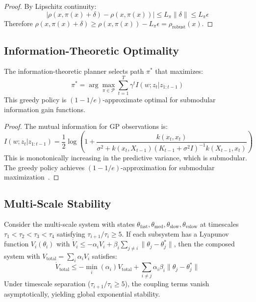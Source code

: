 \begin{proof}
By Lipschitz continuity:
\begin{equation}
    |\rho(x, \pi(x) + \delta) - \rho(x, \pi(x))| \leq L_\pi \|\delta\| \leq L_\pi \epsilon
\end{equation}
Therefore $\rho(x, \pi(x) + \delta) \geq \rho(x, \pi(x)) - L_\pi \epsilon = \rho_{\text{robust}}(x)$.
\end{proof}

\subsection{Information-Theoretic Optimality}

\begin{theorem}
\label{thm:info_optimality}
The information-theoretic planner selects path $\pi^*$ that maximizes:
\begin{equation}
    \pi^* = \arg\max_{\pi \in \mathcal{P}} \sum_{t=1}^T \gamma^t I(w; z_t | z_{1:t-1})
\end{equation}
This greedy policy is $(1 - 1/e)$-approximate optimal for submodular information gain functions.
\end{theorem}

\begin{proof}
The mutual information for GP observations is:
\begin{equation}
    I(w; z_t | z_{1:t-1}) = \frac{1}{2} \log\left(1 + \frac{k(x_t, x_t)}{\sigma^2 + k(x_t, X_{t-1})(K_{t-1} + \sigma^2 I)^{-1}k(X_{t-1}, x_t)}\right)
\end{equation}
This is monotonically increasing in the predictive variance, which is submodular. The greedy policy achieves $(1 - 1/e)$-approximation for submodular maximization~\cite{krause2008near}.
\end{proof}

\subsection{Multi-Scale Stability}

\begin{theorem}
\label{thm:multiscale_stability}
Consider the multi-scale system with states $\theta_{\text{fast}}, \theta_{\text{med}}, \theta_{\text{slow}}, \theta_{\text{vslow}}$ at timescales $\tau_1 < \tau_2 < \tau_3 < \tau_4$ satisfying $\tau_{i+1}/\tau_i \geq 5$. If each subsystem has a Lyapunov function $V_i(\theta_i)$ with $\dot{V}_i \leq -\alpha_i V_i + \beta_i \sum_{j \neq i} \|\theta_j - \theta_j^*\|$, then the composed system with $V_{\text{total}} = \sum_i \alpha_i V_i$ satisfies:
\begin{equation}
    \dot{V}_{\text{total}} \leq -\min_i(\alpha_i) V_{\text{total}} + \sum_{i \neq j} \alpha_i \beta_i \|\theta_j - \theta_j^*\|
\end{equation}
Under timescale separation ($\tau_{i+1}/\tau_i \geq 5$), the coupling terms vanish asymptotically, yielding global exponential stability.
\end{theorem}

